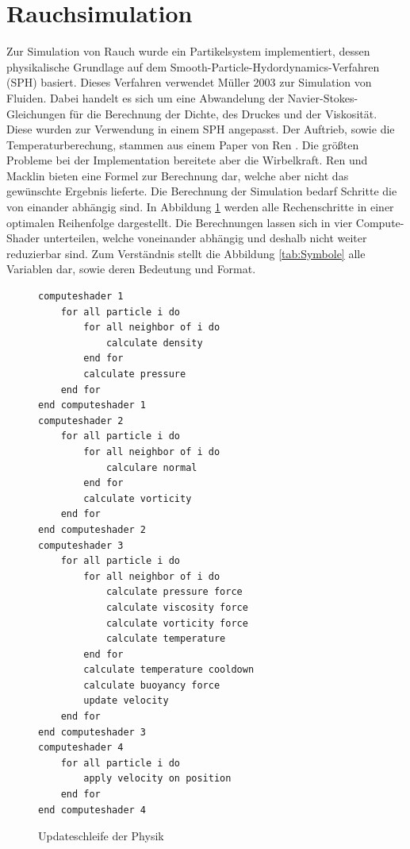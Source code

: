 \documentclass[intern,palatino]{cgBA}
\begin{document}

\section{Rauchsimulation}\label{rauch}

Zur Simulation von Rauch wurde ein Partikelsystem implementiert, dessen physikalische Grundlage auf dem Smooth-Particle-Hydordynamics-Verfahren (SPH) basiert. Dieses Verfahren verwendet Müller \cite{muller2003particle} 2003 zur Simulation von Fluiden. Dabei handelt es sich um eine Abwandelung der Navier-Stokes-Gleichungen für die Berechnung der Dichte, des Druckes und der Viskosität. Diese wurden zur Verwendung in einem SPH angepasst. Der Auftrieb, sowie die Temperaturberechung, stammen aus einem Paper von Ren \cite{ren2016fast}. Die größten Probleme bei der Implementation bereitete aber die Wirbelkraft. Ren und Macklin \cite{macklin2014unified} bieten eine Formel zur Berechnung dar, welche aber nicht das gewünschte Ergebnis lieferte.
\newline
Die Berechnung der Simulation bedarf Schritte die von einander abhängig sind. In Abbildung \ref{code:sim} werden alle Rechenschritte in einer optimalen Reihenfolge dargestellt. Die Berechnungen lassen sich in vier Compute-Shader unterteilen, welche voneinander abhängig und deshalb nicht weiter reduzierbar sind.
\newline
Zum Verständnis stellt die Abbildung \ref{tab:Symbole} alle Variablen dar, sowie deren Bedeutung und Format.

\begin{figure} [H]
	\centering
	\begin{lstlisting}
computeshader 1	
	for all particle i do
		for all neighbor of i do
			calculate density
		end for
		calculate pressure
	end for
end computeshader 1
computeshader 2
	for all particle i do
		for all neighbor of i do
			calculare normal
		end for
		calculate vorticity
	end for
end computeshader 2
computeshader 3
	for all particle i do
		for all neighbor of i do
			calculate pressure force
			calculate viscosity force
			calculate vorticity force
			calculate temperature
		end for
		calculate temperature cooldown
		calculate buoyancy force
		update velocity
	end for
end computeshader 3
computeshader 4
	for all particle i do
		apply velocity on position
	end for
end computeshader 4
	\end{lstlisting}
	\caption{Updateschleife der Physik}
	\label{code:sim}
\end{figure}
\end{document}
